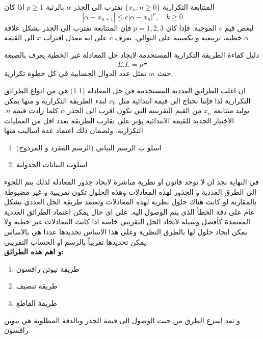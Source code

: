 \begin{definition}
	المتتابعة التكرارية $\{x_n:n\geq0\}$ تقترب الى الجذر $\alpha$ بالرتبة $p\geq1$ اذا كان
	\[
	|\alpha - x_{n+1}| \leq c |\alpha - x_n|^p,\quad k\geq 0
	\]
	لبعض قيم $c$ الموجبة. فإذا كان $p=1,2,3$ فإن المتتابعة تقترب الى الجذر بشكل علاقة خطية، تربيعية و تكعيبية على التوالي. يعرف $c$ على انه معدل اقتراب $x$ الى القيمة $\alpha$
\end{definition}

\begin{definition}
	دليل كفاءة الطريقة التكرارية المستخدمة لايجاد حل المعادلة غير الخطية يعرف بالصيغة
	\[
	E.I. = p^{\frac{1}{m}}
	\]
	حيث $m$ تمثل عدد الدوال الحسابية في كل خطوة تكرارية.
\end{definition}

\begin{definition}
	ان اغلب الطرائق العددية المستخدمة في حل المعادلة (1.1) هي من انواع الطرائق التكرارية لذا فإننا نحتاج الى قيمة ابتدائية مثل $x_0$ لبدء الطريقة التكرارية و منها يمكن توليد متتابعة $x_n$ من القيم التقريبية التي تكون اقرب الى الجذر $\alpha$ كلما زادت قيمة $n$. الاختيار الجديد للقيمة الابتدائية يؤثر على تقارب الطريقة بعدد اقل من العمليات التكرارية. ولضمان ذلك اعتماد عدة اساليب منها
	\begin{enumerate}
		\item اسلو ب الرسم البياني (الرسم المفرد و المزدوج)
		\item اسلوب البيانات الجدولية
	\end{enumerate}
\end{definition}
في النهاية نجد ان لا يوجد قانون او نظرية مباشرة لايجاد جذور المعادلة لذلك يتم اللجوء الى الطرق العددية و الجذور لهذه المعادلات وهذه الحلول تكون تقريبية و غير مضبوطة بالمقارنة لو كانت هناك حلول نظرية لهذه المعادلات وتعتمد طريقة الحل العددي بشكل عام على دقة الخطأ الذي يتم الوصول اليه. على اي حال يمكن اعتماد الطرائق العددية المعتمدة كأفضل وسيلة لايجاد الحل التقريبي خاصة اذا كانت المعادلات غير خطية ولا يمكن ايجاد حلول لها بالطرق النظرية وعلى هذا الاساس تحديدها عددا هي بالاساس يمكن تحديدها تقريباً بالرسم او الحساب التقريبي.\\  [15pt]
\textbf{و اهم هذه الطرائق:}
\begin{enumerate}[label=$\bullet$]
	\item طريقة نيوتن-رافسون
	\item  طريقة تنصيف 
	\item طريقة القاطع
\end{enumerate}
و تعد اسرع الطرق من حيث الوصول الى قيمة الجذر وبالدقة المطلوبة هي نيوتن رافسون.



